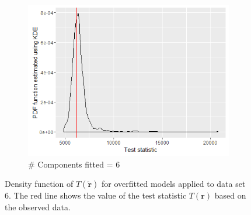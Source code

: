 \begin{figure}[!htb]
\begin{subfigure}[b]{0.4\textwidth}
		\includegraphics[width=\textwidth]{mainmatter/chapter_5_simulation_study/ppc_5wellsep6comp.png}
          \caption{\label{fig : ppc_5wellsep6comp}\# Components fitted = 6}
	\end{subfigure}
	
	\caption{Density function of $T(\boldsymbol{\tilde{r}})$ for overfitted models applied to data set 6. The red line shows the value of the test statistic $T(\boldsymbol{r})$ based on the observed data.}
	\label{fig : ppc_5wellsepcomp_overfitted}    
\end{figure}

